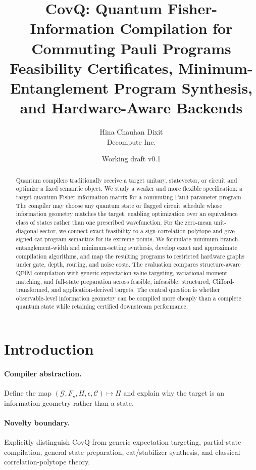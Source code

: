 \documentclass[11pt]{article}
\title{CovQ: Quantum Fisher-Information Compilation for Commuting Pauli Programs\\\large Feasibility Certificates, Minimum-Entanglement Program Synthesis, and Hardware-Aware Backends}
\author{Hina Chauhan Dixit\\Decompute Inc.}
\date{Working draft v0.1}
\begin{document}
\maketitle

\begin{abstract}
Quantum compilers traditionally receive a target unitary, statevector, or circuit and optimize a fixed semantic object. We study a weaker and more flexible specification: a target quantum Fisher information matrix for a commuting Pauli parameter program. The compiler may choose any quantum state or flagged circuit schedule whose information geometry matches the target, enabling optimization over an equivalence class of states rather than one prescribed wavefunction. For the zero-mean unit-diagonal sector, we connect exact feasibility to a sign-correlation polytope and give signed-cat program semantics for its extreme points. We formulate minimum branch-entanglement-width and minimum-setting synthesis, develop exact and approximate compilation algorithms, and map the resulting programs to restricted hardware graphs under gate, depth, routing, and noise costs. The evaluation compares structure-aware QFIM compilation with generic expectation-value targeting, variational moment matching, and full-state preparation across feasible, infeasible, structured, Clifford-transformed, and application-derived targets. The central question is whether observable-level information geometry can be compiled more cheaply than a complete quantum state while retaining certified downstream performance.
\end{abstract}

\section{Introduction}
\paragraph{Compiler abstraction.}
Define the map $(\mathcal G,F_\star,H,\epsilon,\mathcal C)\mapsto\Pi$ and explain why the target is an information geometry rather than a state.

\paragraph{Novelty boundary.}
Explicitly distinguish CovQ from generic expectation targeting, partial-state compilation, general state preparation, cat/stabilizer synthesis, and classical correlation-polytope theory.
\end{document}
